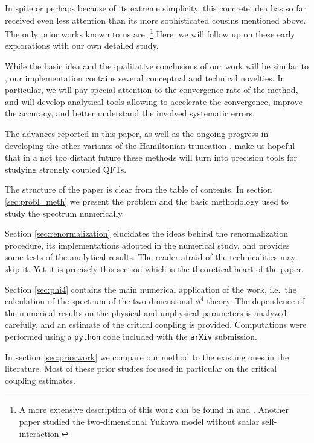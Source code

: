 \documentclass[11pt]{article}
\numberwithin{equation}{section}
\begin{document}
In spite or perhaps because of its extreme simplicity, this concrete idea has so far received even less attention than its more sophisticated cousins mentioned above. The only prior works known to us are \cite{Lee:2000ac,Lee:2000xna}.\footnote{A more extensive description of this work can be found in \cite{Salwen:2002dx} and \cite{Windoloski}. Another paper \cite{Brooks:1983sb} studied the two-dimensional Yukawa model without scalar self-interaction.} Here, we will follow up on these early explorations with our own detailed study.

While the basic idea and the qualitative conclusions of our work will be similar to \cite{Lee:2000ac,Lee:2000xna}, our implementation contains several conceptual and technical novelties. In particular, we will pay special attention to the convergence rate of the method, and will develop analytical tools allowing to accelerate the convergence, improve the accuracy, and better understand the involved systematic errors. 

The advances reported in this paper, as well as the ongoing progress in developing the other variants of the Hamiltonian truncation \cite{Katz:2013qua,Katz:2014uoa,Chabysheva:2014rra}, \cite{Giokas:2011ix,Lencses:2014tba,Hogervorst:2014rta} make us hopeful that in a not too distant future these methods will turn into precision tools for studying strongly coupled QFTs. 

The structure of the paper is clear from the table of contents. 
In section \ref{sec:probl_meth} we present the problem and the basic methodology used to study the spectrum numerically. 

Section \ref{sec:renormalization} elucidates the ideas behind the renormalization procedure, its implementations adopted in the numerical study, and provides some tests of the analytical results. The reader afraid of the technicalities may skip it. Yet it is precisely this section which is the theoretical heart of the paper. 

Section \ref{sec:phi4} contains the main numerical application of the work, i.e.~the calculation of the spectrum of the two-dimensional $\phi^4$ theory. The dependence of the numerical results on the physical and unphysical parameters is analyzed carefully, and an estimate of the critical coupling is provided. Computations were performed using a {\tt python} code included with the {\tt arXiv} submission.

In section \ref{sec:priorwork} we compare our method to the existing ones in the literature. Most of these prior studies focused in particular on the critical coupling estimates.
\end{document}
